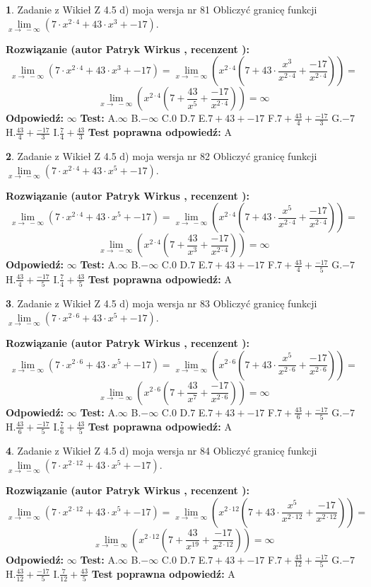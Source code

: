 \documentclass[12pt, a4paper]{article}
\theoremstyle{definition} %
\newtheorem{zad}{}
\newcommand{\zadStart}[1]{\begin{zad}#1\newline}
\newcommand{\zadStop}{\end{zad}}
\newcommand{\rozwStart}[2]{\noindent \textbf{Rozwiązanie (autor #1 , recenzent #2): }\newline}
\newcommand{\rozwStop}{\newline}
\newcommand{\odpStart}{\noindent \textbf{Odpowiedź:}\newline}
\newcommand{\odpStop}{\newline}
\newcommand{\testStart}{\noindent \textbf{Test:}\newline}
\newcommand{\testStop}{\newline}
\newcommand{\kluczStart}{\noindent \textbf{Test poprawna odpowiedź:}\newline}
\newcommand{\kluczStop}{\newline}
\begin{document}
\zadStart{Zadanie z Wikieł Z 4.5 d) moja wersja nr 81}
Obliczyć granicę funkcji  $\lim\limits_{x\to\ -\infty}(7 \cdot x^{2\cdot4}+43 \cdot x^{3}+-17)$.
\zadStop
\rozwStart{Patryk Wirkus}{}
$$\lim\limits_{x\to\ -\infty}(7 \cdot x^{2\cdot4}+43 \cdot x^{3}+-17) = \lim\limits_{x\to\ -\infty}(x^{2\cdot4}(7 +43 \cdot \frac{x^{3}}{x^{2\cdot4}}+\frac{-17}{x^{2\cdot4}})) =$$ $$\lim\limits_{x\to\ -\infty}(x^{2\cdot4}(7 +\frac{43}{x^{5}}+\frac{-17}{x^{2\cdot4}})) =\infty$$
\rozwStop
\odpStart
$\infty$
\odpStop
\testStart
A.$\infty$ B.$-\infty$ C.$0$ D.$7$ E.$7 + 43 + -17$
F.$7+\frac{43}{4}+\frac{-17}{3}$ G.$-7$
H.$\frac{43}{4}+\frac{-17}{3}$
I.$\frac{7}{4}+\frac{43}{3}$
\testStop
\kluczStart
A
\kluczStop



\zadStart{Zadanie z Wikieł Z 4.5 d) moja wersja nr 82}
Obliczyć granicę funkcji  $\lim\limits_{x\to\ -\infty}(7 \cdot x^{2\cdot4}+43 \cdot x^{5}+-17)$.
\zadStop
\rozwStart{Patryk Wirkus}{}
$$\lim\limits_{x\to\ -\infty}(7 \cdot x^{2\cdot4}+43 \cdot x^{5}+-17) = \lim\limits_{x\to\ -\infty}(x^{2\cdot4}(7 +43 \cdot \frac{x^{5}}{x^{2\cdot4}}+\frac{-17}{x^{2\cdot4}})) =$$ $$\lim\limits_{x\to\ -\infty}(x^{2\cdot4}(7 +\frac{43}{x^{3}}+\frac{-17}{x^{2\cdot4}})) =\infty$$
\rozwStop
\odpStart
$\infty$
\odpStop
\testStart
A.$\infty$ B.$-\infty$ C.$0$ D.$7$ E.$7 + 43 + -17$
F.$7+\frac{43}{4}+\frac{-17}{5}$ G.$-7$
H.$\frac{43}{4}+\frac{-17}{5}$
I.$\frac{7}{4}+\frac{43}{5}$
\testStop
\kluczStart
A
\kluczStop



\zadStart{Zadanie z Wikieł Z 4.5 d) moja wersja nr 83}
Obliczyć granicę funkcji  $\lim\limits_{x\to\ -\infty}(7 \cdot x^{2\cdot6}+43 \cdot x^{5}+-17)$.
\zadStop
\rozwStart{Patryk Wirkus}{}
$$\lim\limits_{x\to\ -\infty}(7 \cdot x^{2\cdot6}+43 \cdot x^{5}+-17) = \lim\limits_{x\to\ -\infty}(x^{2\cdot6}(7 +43 \cdot \frac{x^{5}}{x^{2\cdot6}}+\frac{-17}{x^{2\cdot6}})) =$$ $$\lim\limits_{x\to\ -\infty}(x^{2\cdot6}(7 +\frac{43}{x^{7}}+\frac{-17}{x^{2\cdot6}})) =\infty$$
\rozwStop
\odpStart
$\infty$
\odpStop
\testStart
A.$\infty$ B.$-\infty$ C.$0$ D.$7$ E.$7 + 43 + -17$
F.$7+\frac{43}{6}+\frac{-17}{5}$ G.$-7$
H.$\frac{43}{6}+\frac{-17}{5}$
I.$\frac{7}{6}+\frac{43}{5}$
\testStop
\kluczStart
A
\kluczStop



\zadStart{Zadanie z Wikieł Z 4.5 d) moja wersja nr 84}
Obliczyć granicę funkcji  $\lim\limits_{x\to\ -\infty}(7 \cdot x^{2\cdot12}+43 \cdot x^{5}+-17)$.
\zadStop
\rozwStart{Patryk Wirkus}{}
$$\lim\limits_{x\to\ -\infty}(7 \cdot x^{2\cdot12}+43 \cdot x^{5}+-17) = \lim\limits_{x\to\ -\infty}(x^{2\cdot12}(7 +43 \cdot \frac{x^{5}}{x^{2\cdot12}}+\frac{-17}{x^{2\cdot12}})) =$$ $$\lim\limits_{x\to\ -\infty}(x^{2\cdot12}(7 +\frac{43}{x^{19}}+\frac{-17}{x^{2\cdot12}})) =\infty$$
\rozwStop
\odpStart
$\infty$
\odpStop
\testStart
A.$\infty$ B.$-\infty$ C.$0$ D.$7$ E.$7 + 43 + -17$
F.$7+\frac{43}{12}+\frac{-17}{5}$ G.$-7$
H.$\frac{43}{12}+\frac{-17}{5}$
I.$\frac{7}{12}+\frac{43}{5}$
\testStop
\kluczStart
A
\kluczStop
\end{document}
